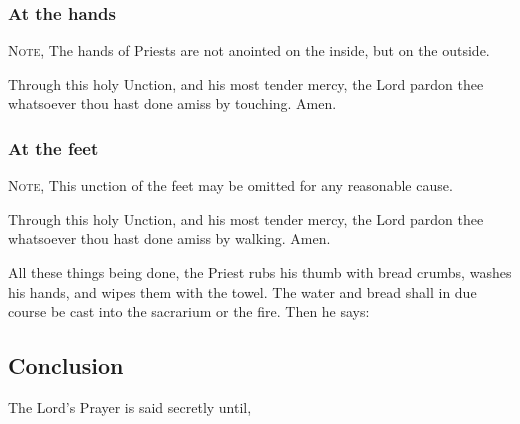 \vspace{-0.25\baselineskip}

\subsubsection{At the hands}

\vspace{-0.25\baselineskip}
\par\noindent
\begin{rubric}
    \textsc{Note,} The hands of Priests are not anointed on the inside, but on the outside.
\end{rubric}\par\noindent
Through this holy {} Unction, and his most tender mercy, the Lord pardon thee whatsoever thou hast done amiss by touching. Amen.

\vspace{-0.25\baselineskip}

\subsubsection{At the feet}

\vspace{-0.25\baselineskip}
\par\noindent
\begin{rubric}
    \textsc{Note,} This unction of the feet may be omitted for any reasonable cause.
\end{rubric}\par\noindent
Through this holy {} Unction, and his most tender mercy, the Lord pardon thee whatsoever thou hast done amiss by walking. Amen.
\begin{rubric}
    All these things being done, the Priest rubs his thumb with bread crumbs, washes his hands, and wipes them with the towel. The water and bread shall in due course be cast into the sacrarium or the fire. Then he says:
\end{rubric}
\subsection{Conclusion}
\begin{rubric}
    The Lord's Prayer is said secretly until,
\end{rubric}\par
{}

